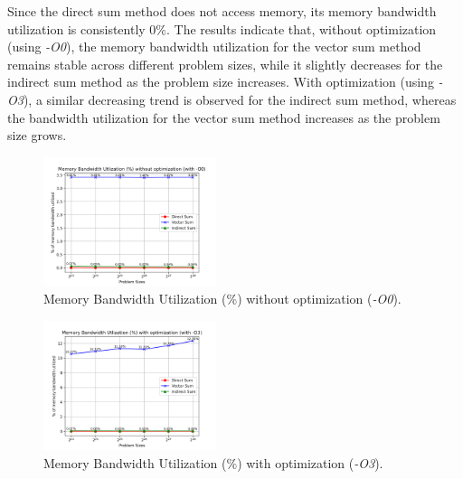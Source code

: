 Since the direct sum method does not access memory, its memory bandwidth utilization is consistently \(0\%\). The results indicate that, without optimization (using \textit{-O0}), the memory bandwidth utilization for the vector sum method remains stable across different problem sizes, while it slightly decreases for the indirect sum method as the problem size increases. With optimization (using \textit{-O3}), a similar decreasing trend is observed for the indirect sum method, whereas the bandwidth utilization for the vector sum method increases as the problem size grows.
\begin{figure}[htbp]
    \centering
    \includegraphics[width=0.45\textwidth]{Bandwidth_O0.png}
    \caption{Memory Bandwidth Utilization (\%) without optimization (\textit{-O0}).}
    \label{fig:Bandwidth_O0}
\end{figure}

\begin{figure}[htbp]
    \centering
    \includegraphics[width=0.45\textwidth]{Bandwidth_O3.png}
    \caption{Memory Bandwidth Utilization (\%) with optimization (\textit{-O3}).}
    \label{fig:Bandwidth_O3}
\end{figure}

